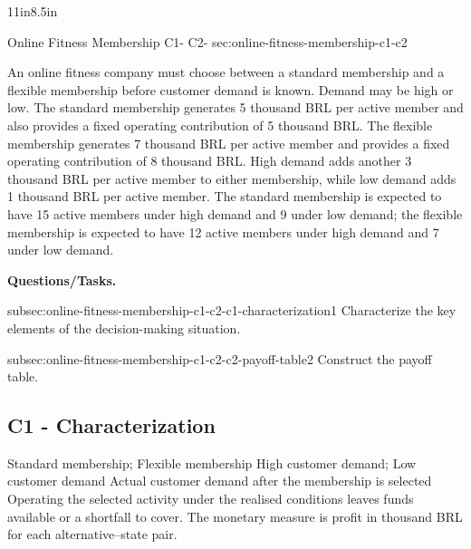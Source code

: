 {\begin{CalculationLandscape}{11in}{8.5in}
		
		\begingroup\renewcommand{\CalculationStateCount}{2}
\endgroup
\end{CalculationLandscape}

		
		\vspace{-5mm}
	}
	
	
	\sectionScored
	{Online Fitness Membership}
	{C1- \hspace{2mm} C2-}
	{sec:online-fitness-membership-c1-c2}
	{
		An online fitness company must choose between a standard membership and a flexible membership before customer demand is known. Demand may be high or low. The standard membership generates 5 thousand BRL per active member and also provides a fixed operating contribution of 5 thousand BRL. The flexible membership generates 7 thousand BRL per active member and provides a fixed operating contribution of 8 thousand BRL. High demand adds another 3 thousand BRL per active member to either membership, while low demand adds 1 thousand BRL per active member. The standard membership is expected to have 15 active members under high demand and 9 under low demand; the flexible membership is expected to have 12 active members under high demand and 7 under low demand.
		
		\textbf{Questions/Tasks.}
		\begin{enumerate}
			\CriterionTask
			{subsec:online-fitness-membership-c1-c2-c1-characterization}{1}
			{Characterize the key elements of the decision-making situation. }
			
			\CriterionTask
			{subsec:online-fitness-membership-c1-c2-c2-payoff-table}{2}
			{Construct the payoff table. }
		\end{enumerate}
		
		\label{subsec:online-fitness-membership-c1-c2-c1-characterization}
		\subsection*{C1 - Characterization }
		
		\DecisionElementsTable
{Standard membership; Flexible membership}
{High customer demand; Low customer demand}
{Actual customer demand after the membership is selected}
{Operating the selected activity under the realised conditions leaves funds available or a shortfall to cover. The monetary measure is profit in thousand BRL for each alternative--state pair.}

}
